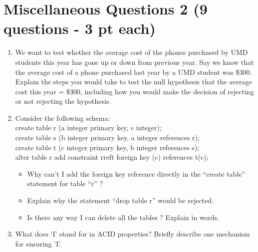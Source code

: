 \documentclass[11pt]{article}
\newcommand{\answer}[2]{\noindent {\bf Answer:} #2}
\renewcommand{\answer}[2]{\vspace{#1}}
\begin{document}
\section*{Miscellaneous Questions 2 (9 questions - 3 pt each)}
\begin{enumerate}

\item We want to test whether the average cost of the phones purchased by UMD students this year has gone up or down from previous year. Say we 
know that the average cost of a phone purchased last year by a UMD student was \$300. Explain the steps you would take to test 
the null hypothesis that the average cost this year = \$300, including how you would make the decision of rejecting or not rejecting the hypothesis.

\answer{3.9in}{ }

\item Consider the following schema: \\
        create table r (a integer primary key, c integer); \\
        create table s (b integer primary key, a integer references r); \\
        create table t (c integer primary key, b integer references s); \\
        alter table r add constraint rreft foreign key (c) references t(c);

        \begin{itemize}
            \item Why can't I add the foreign key reference directly in the ``create table'' statement for table ``r'' ?

                \answer{.8in}{The table ``t'' hasn't been created yet.}
            \item Explain why the statement ``drop table r'' would be rejected.

                \answer{.8in}{Because there is a referential integrity constraint from ``s''.}
            \item Is there any way I can delete all the tables ? Explain in words.

                \answer{.8in}{Just reverse what we did to create the ``cyclic'' integrity constraints above. First alter the table ``r'' to 
                remove the referential integrity constraint, and then delete ``t'', and then ``s'', and finally ``r''.}
        \end{itemize}


\item What does `I' stand for in ACID properties? Briefly describe one mechanism for ensuring 'I'. 


\end{enumerate}
\end{document}

